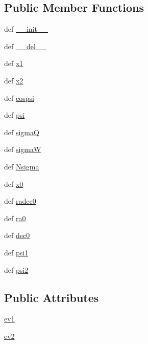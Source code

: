 \subsection*{Public Member Functions}
\begin{DoxyCompactItemize}
\item 
def \hyperlink{classamonpy_1_1anal_1_1cluster_1_1_fisher_a1e13053a9daa25129c9c2090b2834434}{\-\_\-\-\_\-init\-\_\-\-\_\-}
\item 
def \hyperlink{classamonpy_1_1anal_1_1cluster_1_1_fisher_a238e5334a3a13208ebeac508dedc55ff}{\-\_\-\-\_\-del\-\_\-\-\_\-}
\item 
def \hyperlink{classamonpy_1_1anal_1_1cluster_1_1_fisher_add8460bfd7a9fa30956eee8248ccff99}{x1}
\item 
def \hyperlink{classamonpy_1_1anal_1_1cluster_1_1_fisher_a1865f423eaf9db7e167962310c3bf72c}{x2}
\item 
def \hyperlink{classamonpy_1_1anal_1_1cluster_1_1_fisher_ab95d705b923546dc9977d8171b6eab49}{cospsi}
\item 
def \hyperlink{classamonpy_1_1anal_1_1cluster_1_1_fisher_a685cc6a7da95f2d37d5aac4eea88e244}{psi}
\item 
def \hyperlink{classamonpy_1_1anal_1_1cluster_1_1_fisher_ac3ecfdabbf304533940d63c1af93de8f}{sigma\-Q}
\item 
def \hyperlink{classamonpy_1_1anal_1_1cluster_1_1_fisher_ab42c5b1d33517dacb0f4885607873780}{sigma\-W}
\item 
def \hyperlink{classamonpy_1_1anal_1_1cluster_1_1_fisher_aaaec3b4e68a97b73d359858cdd11ad65}{Nsigma}
\item 
def \hyperlink{classamonpy_1_1anal_1_1cluster_1_1_fisher_a20eff95eb8d36f153875752a81fcadbc}{x0}
\item 
def \hyperlink{classamonpy_1_1anal_1_1cluster_1_1_fisher_a8f261458556cf374fb773fe17950610d}{radec0}
\item 
def \hyperlink{classamonpy_1_1anal_1_1cluster_1_1_fisher_aa91ec0a66f3d15037cc2e9c4fe51e258}{ra0}
\item 
def \hyperlink{classamonpy_1_1anal_1_1cluster_1_1_fisher_a60cc5f63c12c34f67e51de2dbf7b1ad2}{dec0}
\item 
def \hyperlink{classamonpy_1_1anal_1_1cluster_1_1_fisher_a0818967bb958e432d500365356f25754}{psi1}
\item 
def \hyperlink{classamonpy_1_1anal_1_1cluster_1_1_fisher_aec59ac332e02859dcc3e55e177ca6735}{psi2}
\end{DoxyCompactItemize}
\subsection*{Public Attributes}
\begin{DoxyCompactItemize}
\item 
\hyperlink{classamonpy_1_1anal_1_1cluster_1_1_fisher_a38c295960480aaacc74561dc8f9ef2af}{ev1}
\item 
\hyperlink{classamonpy_1_1anal_1_1cluster_1_1_fisher_ab2cce79b453ffcfced2266553ea60d19}{ev2}
\end{DoxyCompactItemize}
